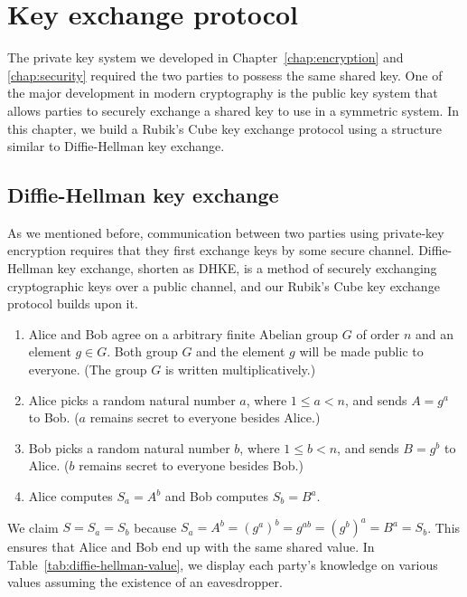 \chapter{Key exchange protocol}\label{chap:exchange}
The private key system we developed in Chapter~\ref{chap:encryption} and \ref{chap:security} required the two parties to possess the same shared key. One of the major development in modern cryptography is the public key system that allows parties to securely exchange a shared key to use in a symmetric system. In this chapter, we build a Rubik's Cube key exchange protocol using a structure similar to Diffie-Hellman key exchange.

\section{Diffie-Hellman key exchange}
\par As we mentioned before, communication between two parties using private-key encryption requires that they first exchange keys by some secure channel. Diffie-Hellman key exchange, shorten as DHKE, is a method of securely exchanging cryptographic keys over a public channel, and our Rubik's Cube key exchange protocol builds upon it.
\begin{enumerate}
    \item Alice and Bob agree on a arbitrary finite Abelian group $G$ of order $n$ and an element $g \in G$. Both group $G$ and the element $g$ will be made public to everyone. (The group $G$ is written multiplicatively.)
    \item Alice picks a random natural number $a$, where $1 \leq a < n$, and sends $A = g^a$ to Bob. ($a$ remains secret to everyone besides Alice.)
    \item Bob picks a random natural number $b$, where $1 \leq b < n$, and sends $B = g^b$ to Alice. ($b$ remains secret to everyone besides Bob.)
    \item Alice computes $S_a = A^b$ and Bob computes $S_b = B^a$.
\end{enumerate}
We claim $S = S_a = S_b$ because $S_a = A^b = (g^a)^b = g^{ab} = (g^b)^a = B^a = S_b$. This ensures that Alice and Bob end up with the same shared value. In Table~\ref{tab:diffie-hellman-value}, we display each party's knowledge on various values assuming the existence of an eavesdropper.
